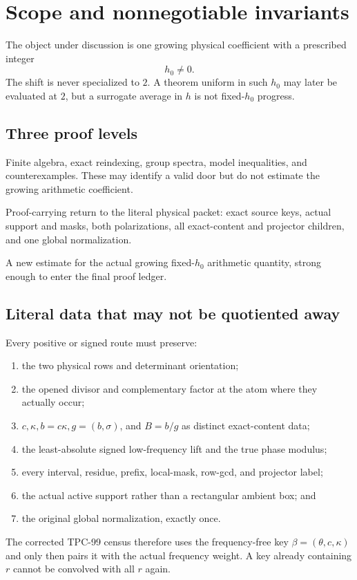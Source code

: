 \section{Scope and nonnegotiable invariants}
\label{sec:scope-invariants}

The object under discussion is one growing physical coefficient
with a prescribed integer
\[
 h_0\ne0.
\]
The shift is never specialized to \(2\).  A theorem uniform in such
\(h_0\) may later be evaluated at \(2\), but a surrogate average in
\(h\) is not fixed-\(h_0\) progress.

\subsection{Three proof levels}

\begin{description}[leftmargin=4.2em,style=nextline]
\item[\(\Lzero\)]
Finite algebra, exact reindexing, group spectra, model inequalities,
and counterexamples.  These may identify a valid door but do not
estimate the growing arithmetic coefficient.
\item[\(\Lone\)]
Proof-carrying return to the literal physical packet: exact source
keys, actual support and masks, both polarizations, all
exact-content and projector children, and one global normalization.
\item[\(\Ltwo\)]
A new estimate for the actual growing fixed-\(h_0\) arithmetic
quantity, strong enough to enter the final proof ledger.
\end{description}

\subsection{Literal data that may not be quotiented away}

Every positive or signed route must preserve:
\begin{enumerate}[leftmargin=2em]
\item the two physical rows and determinant orientation;
\item the opened divisor and complementary factor at the atom where
  they actually occur;
\item \(c,\kappa,b=c\kappa,g=(b,\sigma)\), and \(B=b/g\) as distinct
  exact-content data;
\item the least-absolute signed low-frequency lift and the true
  phase modulus;
\item every interval, residue, prefix, local-mask, row-gcd, and
  projector label;
\item the actual active support rather than a rectangular ambient
  box; and
\item the original global normalization, exactly once.
\end{enumerate}
The corrected TPC-99 census therefore uses the frequency-free key
\(\beta=(\theta,c,\kappa)\) and only then pairs it with the actual
frequency weight.  A key already containing \(r\) cannot be
convolved with all \(r\) again.

